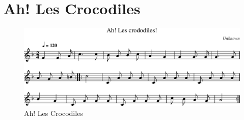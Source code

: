 \chapter{Ah! Les Crocodiles}



\begin{figure}[!htbp]
  \includegraphics[width=\textwidth,height=\textheight,keepaspectratio]{../songs/xx_ah_les_crocodiles.png}
  \caption{Ah! Les Crocodiles}
  \label{fig:xx_ah_les_crocodiles}
\end{figure}
